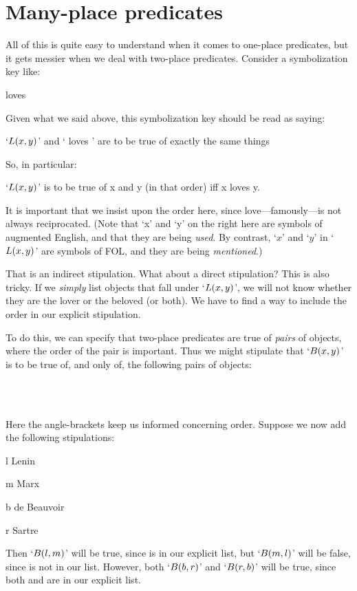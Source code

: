 \section{Many-place predicates}
All of this is quite easy to understand when it comes to one-place predicates, but it gets messier when we deal with two-place predicates. Consider a symbolization key like:
	\begin{ekey}
		\item[\atom{L}{x,y}]  loves 
	\end{ekey}
Given what we said above, this symbolization key should be read as saying:
	\begin{earg}
		\item[\textbullet] `$\mathord{L}(x,y)$' and ` loves ' are to be true of exactly the same things
	\end{earg}
So, in particular:
	\begin{earg}
		\item[\textbullet] `$\mathord{L}(x,y)$' is to be true of x and y (in that order) iff x loves y.
	\end{earg}
It is important that we insist upon the order here, since love---famously---is not always reciprocated. (Note that `x' and `y' on the right here are symbols of augmented English, and that they are being \emph{used}. By contrast, `$x$' and `$y$' in `$\mathord{L}(x,y)$' are symbols of FOL, and they are being \emph{mentioned}.)

That is an indirect stipulation. What about a direct stipulation? This is also tricky. If we \emph{simply} list objects that fall under `$\mathord{L}(x,y)$', we will not know whether they are the lover or the beloved (or both). We have to find a way to include the order in our explicit stipulation.

To do this, we can specify that two-place predicates are true of \emph{pairs} of objects, where the order of the pair is important. Thus we might stipulate that `$\mathord{B}(x,y)$' is to be true of, and only of, the following pairs of objects:
	\begin{center}
		\ntuple{Lenin, Marx}\\
		\ntuple{de Beauvoir, Sartre}\\
		\ntuple{Sartre, de Beauvoir}
	\end{center}
Here the angle-brackets keep us informed concerning order. Suppose we now add the following stipulations:
	\begin{ekey}
		\item[l] Lenin
		\item[m] Marx
		\item[b] de Beauvoir
		\item[r] Sartre
	\end{ekey}
Then `$\mathord{B}(l,m)$' will be true, since  is in our explicit list, but `$\mathord{B}(m,l)$' will be false, since  is not in our list. However, both `$\mathord{B}(b,r)$' and `$\mathord{B}(r,b)$' will be true, since both  and  are in our explicit list.

